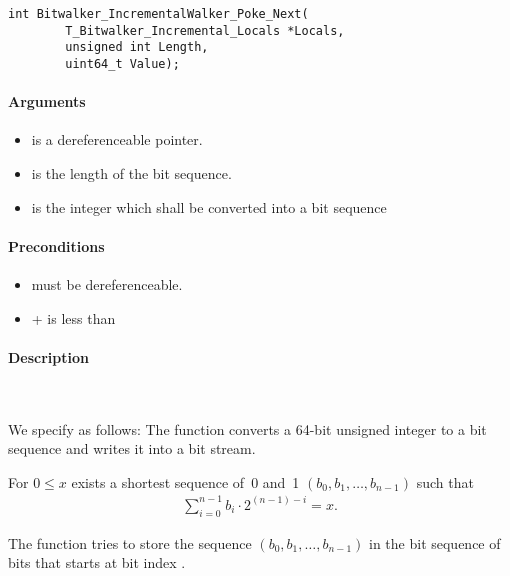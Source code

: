 \begin{lstlisting}[style=acsl-block]
int Bitwalker_IncrementalWalker_Poke_Next(
        T_Bitwalker_Incremental_Locals *Locals,
        unsigned int Length,
        uint64_t Value);
\end{lstlisting}

\paragraph{Arguments}

\begin{itemize}
   \item  {} is a dereferenceable pointer.
   \item {} is the length of the bit sequence.
   \item {} is the integer which shall be converted into a bit sequence
\end{itemize}

\paragraph{Preconditions}
\begin{itemize}
    \item  {} must be dereferenceable.
    \item {} +  is less than 
\end{itemize}

\paragraph{Description}~

We specify \pokenext as follows:
The function \poke converts a 64-bit unsigned integer to a bit sequence and 
writes it into a bit stream.

For $0 \leq x$ exists a shortest sequence of~0 and~1
$(b_0, b_1,\ldots,b_{n - 1})$
such that
\begin{align}
    \sum_{i=0}^{n-1} b_i \cdot 2^{(n - 1) - i} = x.
\end{align}

The function \pokenext tries to store the sequence $(b_0, b_1,\ldots,b_{n - 1})$
in the bit sequence of  bits that starts
at bit index .

